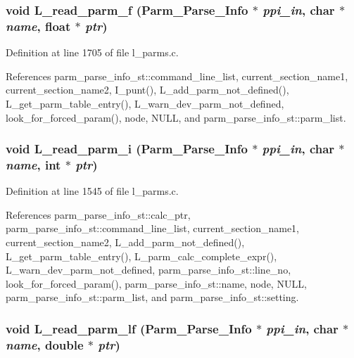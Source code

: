 \subsubsection{\setlength{\rightskip}{0pt plus 5cm}void L\_\-read\_\-parm\_\-f (\bf{Parm\_\-Parse\_\-Info} $\ast$ {\em ppi\_\-in}, char $\ast$ {\em name}, float $\ast$ {\em ptr})}\label{l__parms_8h_69d2c69fef1a9100a445b1bac6dbce60}




Definition at line 1705 of file l\_\-parms.c.

References parm\_\-parse\_\-info\_\-st::command\_\-line\_\-list, current\_\-section\_\-name1, current\_\-section\_\-name2, I\_\-punt(), L\_\-add\_\-parm\_\-not\_\-defined(), L\_\-get\_\-parm\_\-table\_\-entry(), L\_\-warn\_\-dev\_\-parm\_\-not\_\-defined, look\_\-for\_\-forced\_\-param(), node, NULL, and parm\_\-parse\_\-info\_\-st::parm\_\-list.
\subsubsection{\setlength{\rightskip}{0pt plus 5cm}void L\_\-read\_\-parm\_\-i (\bf{Parm\_\-Parse\_\-Info} $\ast$ {\em ppi\_\-in}, char $\ast$ {\em name}, int $\ast$ {\em ptr})}\label{l__parms_8h_ff1906fe6912099e08d84bb82778b69c}




Definition at line 1545 of file l\_\-parms.c.

References parm\_\-parse\_\-info\_\-st::calc\_\-ptr, parm\_\-parse\_\-info\_\-st::command\_\-line\_\-list, current\_\-section\_\-name1, current\_\-section\_\-name2, L\_\-add\_\-parm\_\-not\_\-defined(), L\_\-get\_\-parm\_\-table\_\-entry(), L\_\-parm\_\-calc\_\-complete\_\-expr(), L\_\-warn\_\-dev\_\-parm\_\-not\_\-defined, parm\_\-parse\_\-info\_\-st::line\_\-no, look\_\-for\_\-forced\_\-param(), parm\_\-parse\_\-info\_\-st::name, node, NULL, parm\_\-parse\_\-info\_\-st::parm\_\-list, and parm\_\-parse\_\-info\_\-st::setting.
\subsubsection{\setlength{\rightskip}{0pt plus 5cm}void L\_\-read\_\-parm\_\-lf (\bf{Parm\_\-Parse\_\-Info} $\ast$ {\em ppi\_\-in}, char $\ast$ {\em name}, double $\ast$ {\em ptr})}\label{l__parms_8h_a4e8c282fc28f81f6ece6a572d0b9b12}





